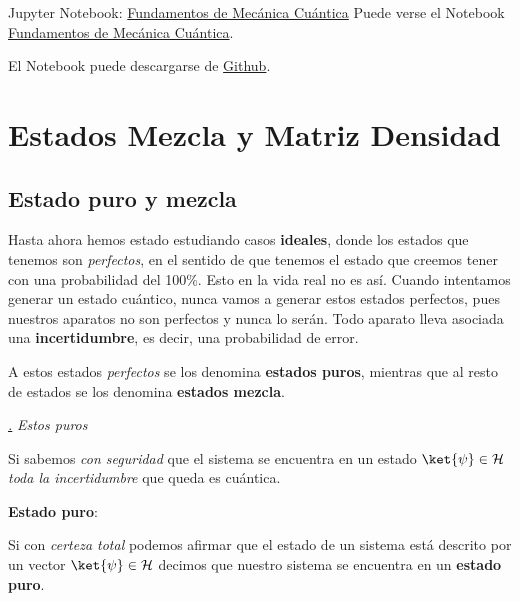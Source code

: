 \documentclass[a4paper,11pt]{book} %
\numberwithin{equation}{chapter}
\def\subsubiContadorIt{\par\addtocounter{subsubsection}{1}\underline{\it\thesubsubsection.}\hskip0.5cm \setcounter{subsubsubsectionIt}{0}}
\newcommand{\SubsubiIt}[1]{
		\subsubiContadorIt \textit{#1}
	}
\newcounter{subsubsubsectionIt}[subsubsection]
\begin{document}
		
	\begin{mybox_orange}{Jupyter Notebook: \href{https://www.scbi.uma.es/web/wp-content/uploads/Jupyterbook/CICC_UMA/Notebooks/html/docs/Part_01/Chapter_01-Fundamentos_MC_evolucion_temporal_myst.html}{Fundamentos de Mecánica Cuántica}}
    Puede verse el Notebook \href{https://www.scbi.uma.es/web/wp-content/uploads/Jupyterbook/CICC_UMA/Notebooks/html/docs/Part_01/Chapter_01-Fundamentos_MC_evolucion_temporal_myst.html}{Fundamentos de Mecánica Cuántica}.
    
    El Notebook puede descargarse de \href{https://github.com/davidcb98/CICC_UMA/blob/master/Notebooks/Part_01/Chapter_01-Fundamentos_MC_evolucion_temporal.ipynb}{Github}.
    \end{mybox_orange}
		
		
		
	\section{Estados Mezcla y Matriz Densidad}



		\subsection{Estado puro y mezcla}

Hasta ahora hemos estado estudiando casos \textbf{ideales}, donde los estados que tenemos son \textit{perfectos}, en el sentido de que tenemos el estado que creemos tener con una probabilidad del 100\%. Esto en la vida real no es así. Cuando intentamos generar un estado cuántico, nunca vamos a generar estos estados perfectos, pues nuestros aparatos no son perfectos y nunca lo serán. Todo aparato lleva asociada una \textbf{incertidumbre}, es decir, una probabilidad de error.

A estos estados \textit{perfectos} se los denomina \textbf{estados puros}, mientras que al resto de estados se los denomina \textbf{estados mezcla}.

			\SubsubiIt{Estos puros}
			
Si sabemos \textit{con seguridad} que el  sistema se encuentra en un estado $\ket{\psi}\in \mathcal{H}$ \textit{toda la incertidumbre} que queda es cuántica.

	\begin{mybox_gray2}{}
	\textbf{Estado puro}:
	
	Si con \textit{certeza total} podemos afirmar que el estado de un sistema está descrito por un vector $\ket{\psi}\in \mathcal{H}$ decimos que nuestro sistema se encuentra en un \textbf{estado puro}.
	\end{mybox_gray2}
\end{document}
